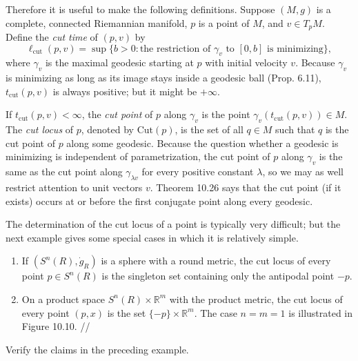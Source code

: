 Therefore it is useful to make the following definitions. Suppose $(M, g)$ is a complete, connected Riemannian manifold, $p$ is a point of $M$, and $v \in T_p M$. Define the \emph{cut time} of $(p,v)$ by
\[
\ell_{\text{cut}}(p, v) = \sup\{b > 0 : \text{the restriction of } \gamma_v \text{ to } [0,b] \text{ is minimizing}\},
\]
where $\gamma_v$ is the maximal geodesic starting at $p$ with initial velocity $v$. Because $\gamma_v$ is minimizing as long as its image stays inside a geodesic ball (Prop. 6.11), $t_{\text{cut}}(p, v)$ is always positive; but it might be $+\infty$.

If $t_{\text{cut}}(p, v) < \infty$, the \emph{cut point} of $p$ along $\gamma_v$ is the point $\gamma_v(t_{\text{cut}}(p, v)) \in M$. The \emph{cut locus} of $p$, denoted by $\text{Cut}(p)$, is the set of all $q \in M$ such that $q$ is the cut point of $p$ along some geodesic. Because the question whether a geodesic is minimizing is independent of parametrization, the cut point of $p$ along $\gamma_v$ is the same as the cut point along $\gamma_{\lambda v}$ for every positive constant $\lambda$, so we may as well restrict attention to unit vectors $v$. Theorem 10.26 says that the cut point (if it exists) occurs at or before the first conjugate point along every geodesic.

The determination of the cut locus of a point is typically very difficult; but the next example gives some special cases in which it is relatively simple.

\begin{example}
\label{ex:cut-loci}

\begin{enumerate}
\item[(a)] If $(S^n(R), \dot{g}_R)$ is a sphere with a round metric, the cut locus of every point $p \in S^n(R)$ is the singleton set containing only the antipodal point $-p$.

\item[(b)] On a product space $S^n(R) \times \mathbb{R}^m$ with the product metric, the cut locus of every point $(p, x)$ is the set $\{-p\} \times \mathbb{R}^m$. The case $n = m = 1$ is illustrated in Figure 10.10. //
\end{enumerate}

\end{example}

\begin{exercise}
\label{exer:verify-cut-loci-claims}

Verify the claims in the preceding example.

\end{exercise}

